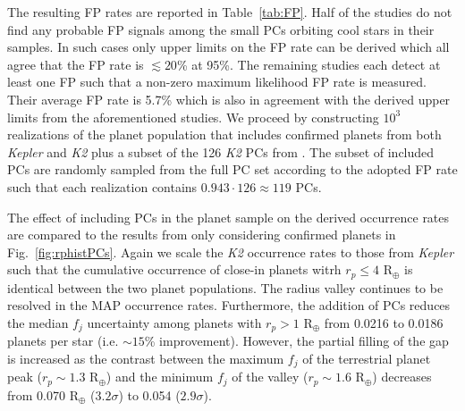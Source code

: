 \documentclass[twocolumn]{emulateapj}
\newcommand{\kepler}[1]{\emph{Kepler}#1}
\newcommand{\ktwo}[1]{\emph{K2}#1}
\begin{document}
The resulting FP rates are reported in Table~\ref{tab:FP}. Half of the studies do not find any probable
FP signals among the small PCs orbiting cool stars in their samples. In such cases only upper limits on the FP rate
can be derived which all agree that the FP rate is $\lesssim 20$\% at 95\%. The remaining studies
each detect at least one FP such that a non-zero maximum likelihood FP rate is measured. Their average FP rate is 5.7\%
which is also in agreement with the derived upper limits from the aforementioned studies.
We proceed by constructing $10^3$ realizations of the planet population
that includes confirmed planets from both \kepler{} and \ktwo{} plus a subset of the 126 \ktwo{} PCs from
\cite{kruse19}. The subset of included PCs are randomly sampled from the full PC set
according to the adopted FP rate such that each realization contains $0.943\cdot 126 \approx 119$ PCs.




The effect of including PCs in the planet sample on the derived occurrence rates are compared to the results
from only considering confirmed planets in Fig.~\ref{fig:rphistPCs}. Again we scale the \ktwo{} occurrence rates
to those from \kepler{} such that the cumulative occurrence of close-in planets witrh $r_p \leq 4$ R$_{\oplus}$
is identical between the two planet populations. The radius valley continues to be resolved in
the MAP occurrence rates. Furthermore, the addition of PCs reduces the median $f_j$ uncertainty among planets
with $r_p>1$ R$_{\oplus}$ from
0.0216 to 0.0186 planets per star (i.e. $\sim 15$\% improvement). However, the partial filling of the gap is
increased as the contrast between the maximum $f_j$ of the terrestrial planet peak ($r_p \sim 1.3$ R$_{\oplus}$)
and the minimum $f_j$ of the valley ($r_p \sim 1.6$ R$_{\oplus}$) decreases from 0.070 R$_{\oplus}$ ($3.2\sigma$)
to 0.054 ($2.9\sigma$).

\begin{figure*}
  \centering
  \caption{Comparison of occurrence rates with and without planet candidates included. \emph{Left panel}:
    same as Fig.~\ref{fig:rphist}. \emph{Right panel}: histogram depicting the relative occurrence
    rate of close-in planets with orbital periods $<100$ days derived from the population of confirmed
    planets from \kepler{} and \ktwo{} and supplemented by 119 PCs
    around low mass stars from \cite{kruse19}. The radius valley continues to be resolved with
    the inclusion of PCs which improve the median uncertainty on the occurrence rate bins although the
    gap becomes less prominent with numerous PCs partially filling the valley.}
  \label{fig:rphistPCs}
\end{figure*}
\end{document}
